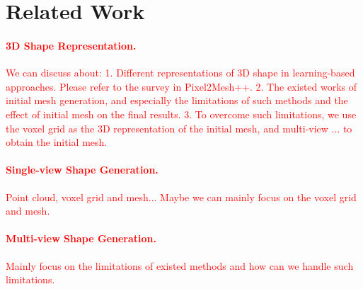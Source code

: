 \section{Related Work}

\textcolor{Red}{
\paragraph{3D Shape Representation.} 
We can discuss about:
1. Different representations of 3D shape in learning-based approaches. Please refer to the survey in Pixel2Mesh++.
2. The existed works of initial mesh generation, and especially the limitations of such methods and the effect of initial mesh on the final results.
3. To overcome such limitations, we use the voxel grid as the 3D representation of the initial mesh, and multi-view ... to obtain the initial mesh.
\paragraph{Single-view Shape Generation.} 
Point cloud, voxel grid and mesh... Maybe we can mainly focus on the voxel grid and mesh.
\paragraph{Multi-view Shape Generation.}
Mainly focus on the limitations of existed methods and how can we handle such limitations.
}

